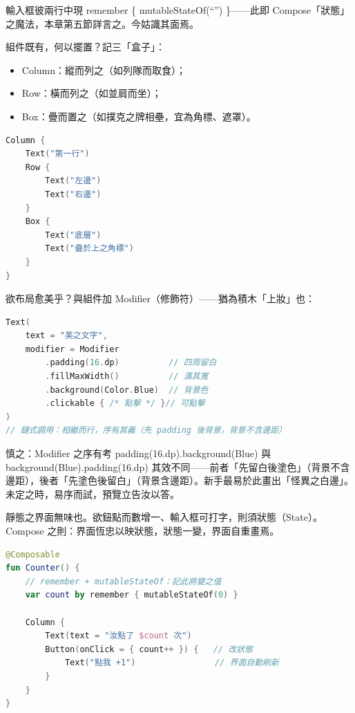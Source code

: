 輸入框彼兩行中現 remember \{ mutableStateOf(“”) \}——此即 Compose「狀態」之魔法，本章第五節詳言之。今姑識其面焉。


組件既有，何以擺置？記三「盒子」：

\begin{itemize}
  \item Column：縱而列之（如列隊而取食）；
  \item Row：橫而列之（如並肩而坐）；
  \item Box：疊而置之（如撲克之牌相壘，宜為角標、遮罩）。
\end{itemize}

\begin{lstlisting}[language=Kotlin]
Column {
    Text("第一行")
    Row {
        Text("左邊")
        Text("右邊")
    }
    Box {
        Text("底層")
        Text("疊於上之角標")
    }
}
\end{lstlisting}

欲布局愈美乎？與組件加 Modifier（修飾符）——猶為積木「上妝」也：

\begin{lstlisting}[language=Kotlin]
Text(
    text = "美之文字",
    modifier = Modifier
        .padding(16.dp)          // 四周留白
        .fillMaxWidth()          // 滿其寬
        .background(Color.Blue)  // 背景色
        .clickable { /* 點擊 */ }// 可點擊
)
// 鏈式調用：相繼而行，序有其義（先 padding 後背景，背景不含邊距）
\end{lstlisting}

\begin{tcbwarn}{慎之：Modifier 之序有考}
padding(16.dp).background(Blue) 與 background(Blue).padding(16.dp) 其效不同——前者「先留白後塗色」（背景不含邊距），後者「先塗色後留白」（背景含邊距）。新手最易於此畫出「怪異之白邊」。未定之時，易序而試，預覽立告汝以答。

\end{tcbwarn}


靜態之界面無味也。欲鈕點而數增一、輸入框可打字，則須狀態（State）。Compose 之則：界面恆忠以映狀態，狀態一變，界面自重畫焉。

\begin{lstlisting}[language=Kotlin]
@Composable
fun Counter() {
    // remember + mutableStateOf：記此將變之值
    var count by remember { mutableStateOf(0) }

    Column {
        Text(text = "汝點了 $count 次")
        Button(onClick = { count++ }) {   // 改狀態
            Text("點我 +1")                // 界面自動刷新
        }
    }
}
\end{lstlisting}

